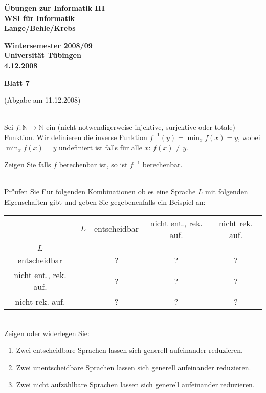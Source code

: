 \documentclass[a4paper]{article}
\def\header#1#2#3{\pagestyle{empty}
\noindent
\begin{minipage}[t]{0.6\textwidth}
\begin{flushleft}
\bf \"Ubungen zur Informatik III\\
WSI f\"ur Informatik\\
Lange/Behle/Krebs
\end{flushleft}
\end{minipage}
\begin{minipage}[t]{0.4\textwidth}
\begin{flushright}
\bf Wintersemester 2008/09\\
Universit\"at T\"ubingen\\
#2 %
\end{flushright}
\end{minipage}

\begin{center}
{\Large\bf Blatt #1}

{(Abgabe am #3)}
\end{center}
\bigskip
}
\begin{document}
\header{7}{4.12.2008}{11.12.2008}

\bigskip
{}\\
Sei $f:\mathbb N\rightarrow\mathbb N$ ein (nicht notwendigerweise injektive, surjektive oder totale) Funktion. Wir definieren die inverse Funktion $f^{-1}(y)=\min_x f(x)=y$, wobei $\min_x f(x)=y$ undefiniert ist falls f\"ur alle $x$: $f(x)\neq y$.

Zeigen Sie falls $f$ berechenbar ist, so ist $f^{-1}$ berechenbar.
\bigskip

\bigskip
{}\\
Pr"ufen Sie f"ur folgenden Kombinationen ob es eine Sprache $L$ mit folgenden Eigenschaften gibt und geben Sie gegebenenfalls ein Beispiel an:\\[1ex]
\begin{tabular}{|cc|c|c|c|}
\hline
& $L$ & entscheidbar & nicht ent., rek. auf. & nicht rek. auf.\\
$\bar L$ &  &  &  &  \\\hline
entscheidbar  &  & ? & ? & ? \\\hline
nicht ent., rek. auf.  &  & ? & ? & ? \\\hline
nicht rek. auf. &  & ? & ? & ? \\\hline
\end{tabular}
\bigskip

\bigskip
{}\\
Zeigen oder widerlegen Sie:
\begin{enumerate}
\item Zwei entscheidbare Sprachen lassen sich generell aufeinander reduzieren.
\item Zwei unentscheidbare Sprachen lassen sich generell aufeinander reduzieren.
\item Zwei nicht aufz\"ahlbare Sprachen lassen sich generell aufeinander reduzieren.
\end{enumerate}
\bigskip
\end{document}
